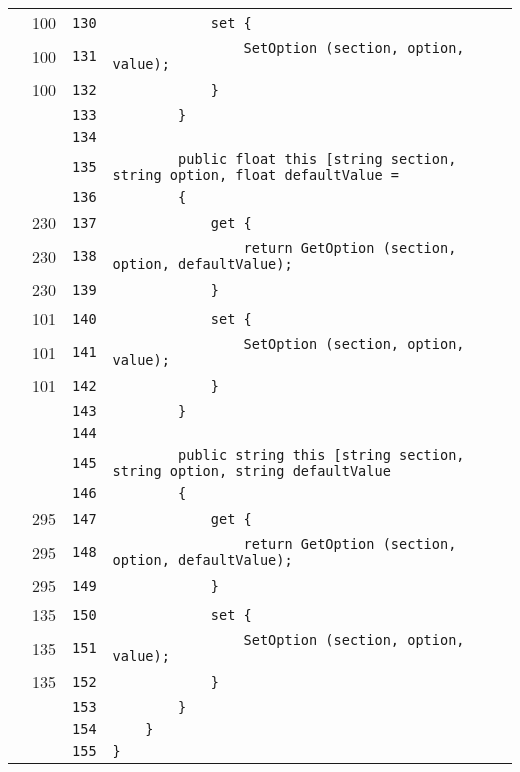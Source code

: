 \documentclass[a4paper,10pt]{article}
\begin{document}
\begin{longtable}[l]{lrrl}
\cellcolor{green} & 100 & \verb~130~ & \verb~            set {~\\
\cellcolor{green} & 100 & \verb~131~ & \verb~                SetOption (section, option, value);~\\
\cellcolor{green} & 100 & \verb~132~ & \verb~            }~\\
\cellcolor{gray} &  & \verb~133~ & \verb~        }~\\
\cellcolor{gray} &  & \verb~134~ & \verb~~\\
\cellcolor{gray} &  & \verb~135~ & \verb~        public float this [string section, string option, float defaultValue =~\\
\cellcolor{gray} &  & \verb~136~ & \verb~        {~\\
\cellcolor{green} & 230 & \verb~137~ & \verb~            get {~\\
\cellcolor{green} & 230 & \verb~138~ & \verb~                return GetOption (section, option, defaultValue);~\\
\cellcolor{green} & 230 & \verb~139~ & \verb~            }~\\
\cellcolor{green} & 101 & \verb~140~ & \verb~            set {~\\
\cellcolor{green} & 101 & \verb~141~ & \verb~                SetOption (section, option, value);~\\
\cellcolor{green} & 101 & \verb~142~ & \verb~            }~\\
\cellcolor{gray} &  & \verb~143~ & \verb~        }~\\
\cellcolor{gray} &  & \verb~144~ & \verb~~\\
\cellcolor{gray} &  & \verb~145~ & \verb~        public string this [string section, string option, string defaultValue~\\
\cellcolor{gray} &  & \verb~146~ & \verb~        {~\\
\cellcolor{green} & 295 & \verb~147~ & \verb~            get {~\\
\cellcolor{green} & 295 & \verb~148~ & \verb~                return GetOption (section, option, defaultValue);~\\
\cellcolor{green} & 295 & \verb~149~ & \verb~            }~\\
\cellcolor{green} & 135 & \verb~150~ & \verb~            set {~\\
\cellcolor{green} & 135 & \verb~151~ & \verb~                SetOption (section, option, value);~\\
\cellcolor{green} & 135 & \verb~152~ & \verb~            }~\\
\cellcolor{gray} &  & \verb~153~ & \verb~        }~\\
\cellcolor{gray} &  & \verb~154~ & \verb~    }~\\
\cellcolor{gray} &  & \verb~155~ & \verb~}~\\
\end{longtable}
\newpage
\end{document}
